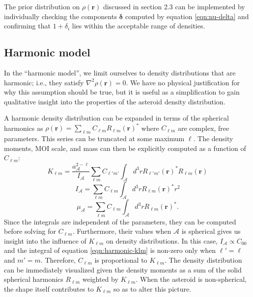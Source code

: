 \documentclass[9pt,twocolumn]{article}
\numberwithin{equation}{section}
\begin{document}
The prior distribution on $\rho(\bm r)$ discussed in section 2.3 can be implemented by individually checking the components $\bm \delta$ computed by equation \ref{eqn:nu-delta} and confirming that $1 + \delta_i$ lies within the acceptable range of densities.


\subsection{Harmonic model}
In the ``harmonic model'', we limit ourselves to density distributions that are harmonic; i.e., they satisfy $\nabla^2 \rho(\bm r) = 0$. We have no physical justification for why this assumption should be true, but it is useful as a simplification to gain qualitative insight into the properties of the asteroid density distribution.

A harmonic density distribution can be expanded in terms of the spherical harmonics as $\rho(\bm r) = \sum_{\ell m} C_{\ell m} R_{\ell m}(\bm r)^*$ where $C_{\ell m}$ are complex, free parameters. This series can be truncated at some maximum $\ell$. The density moments, MOI scale, and mass can then be explicitly computed as a function of $C_{\ell m}$:
\begin{equation}
  K_{\ell m} = \frac{a_\mathcal{A}^{2-\ell}}{I_\mathcal{A}} \sum_{\ell m} C_{\ell' m'} \int_\mathcal{A} d^3 r R_{\ell' m'}(\bm r)^* R_{\ell m}(\bm r)
  \label{eqn:harmonic-klm}
\end{equation}
\begin{equation}
  I_\mathcal{A} = \sum_{\ell m} C_{\ell m} \int_\mathcal{A} d^3 r R_{\ell m}(\bm r)^* r^2
  \label{eqn:harmonic-ia}
\end{equation}
\begin{equation}
  \mu_\mathcal{A} = \sum_{\ell m} C_{\ell m} \int_\mathcal{A} d^3 r R_{\ell m}(\bm r)^*.
  \label{eqn:harmonic-mass}
\end{equation}
Since the integrals are independent of the parameters, they can be computed before solving for $C_{\ell m}$. Furthermore, their values when $\mathcal{A}$ is spherical gives us insight into the influence of $K_{\ell m}$ on density distributions. In this case, $I_\mathcal{A} \propto C_{00}$ and the integral of equation \ref{eqn:harmonic-klm} is non-zero only when $\ell' = \ell$ and $m'=m$. Therefore, $C_{\ell m}$ is proportional to $K_{\ell m}$. The density distribution can be immediately visualized given the density moments as a sum of the solid spherical harmonics $R_{\ell m}$ weighted by $K_{\ell m}$. When the asteroid is non-spherical, the shape itself contributes to $K_{\ell m}$ so as to alter this picture.
\end{document}
